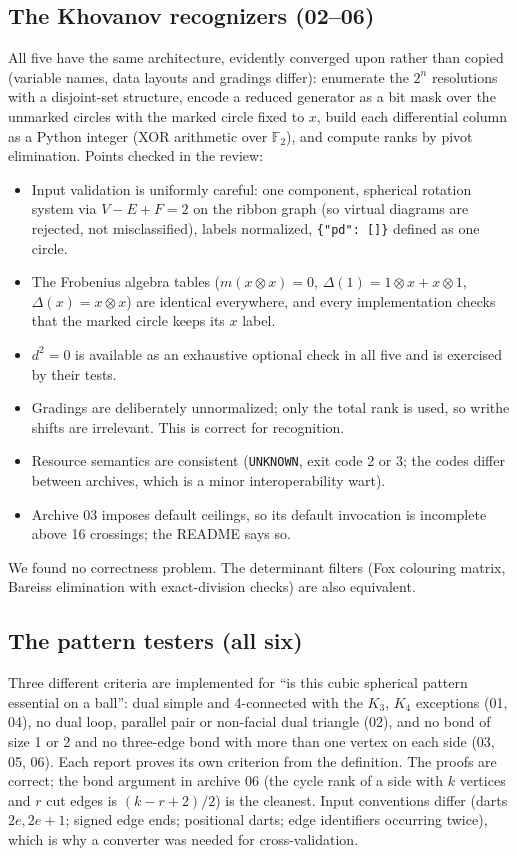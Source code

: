 \documentclass[11pt]{article}
\theoremstyle{remark}
\newcommand{\F}{\mathbb{F}_2}
\newcommand{\code}[1]{\texttt{#1}}
\begin{document}
\subsection{The Khovanov recognizers (02--06)}
All five have the same architecture, evidently converged upon rather than
copied (variable names, data layouts and gradings differ): enumerate the
$2^n$ resolutions with a disjoint-set structure, encode a reduced generator as
a bit mask over the unmarked circles with the marked circle fixed to $x$,
build each differential column as a Python integer (XOR arithmetic over
$\F$), and compute ranks by pivot elimination. Points checked in the review:
\begin{itemize}
\item Input validation is uniformly careful: one component, spherical rotation
  system via $V-E+F=2$ on the ribbon graph (so virtual diagrams are rejected,
  not misclassified), labels normalized, \code{\{"pd": []\}} defined as one circle.
\item The Frobenius algebra tables ($m(x\otimes x)=0$, $\Delta(1)=1\otimes x+x\otimes1$,
  $\Delta(x)=x\otimes x$) are identical everywhere, and every implementation
  checks that the marked circle keeps its $x$ label.
\item $d^2=0$ is available as an exhaustive optional check in all five and
  is exercised by their tests.
\item Gradings are deliberately unnormalized; only the total rank is used, so
  writhe shifts are irrelevant. This is correct for recognition.
\item Resource semantics are consistent (\code{UNKNOWN}, exit code 2 or 3;
  the codes differ between archives, which is a minor interoperability wart).
\item Archive 03 imposes default ceilings, so its default invocation is
  incomplete above 16 crossings; the README says so.
\end{itemize}
We found no correctness problem. The determinant filters (Fox colouring
matrix, Bareiss elimination with exact-division checks) are also equivalent.

\subsection{The pattern testers (all six)}
Three different criteria are implemented for ``is this cubic spherical
pattern essential on a ball'': dual simple and 4-connected with the $K_3$,
$K_4$ exceptions (01, 04), no dual loop, parallel pair or non-facial dual
triangle (02), and no bond of size 1 or 2 and no three-edge bond with more
than one vertex on each side (03, 05, 06). Each report proves its own
criterion from the definition. The proofs are correct; the bond argument in
archive 06 (the cycle rank of a side with $k$ vertices and $r$ cut edges is
$(k-r+2)/2$) is the cleanest. Input conventions differ (darts $2e,2e+1$;
signed edge ends; positional darts; edge identifiers occurring twice), which
is why a converter was needed for cross-validation.
\end{document}
